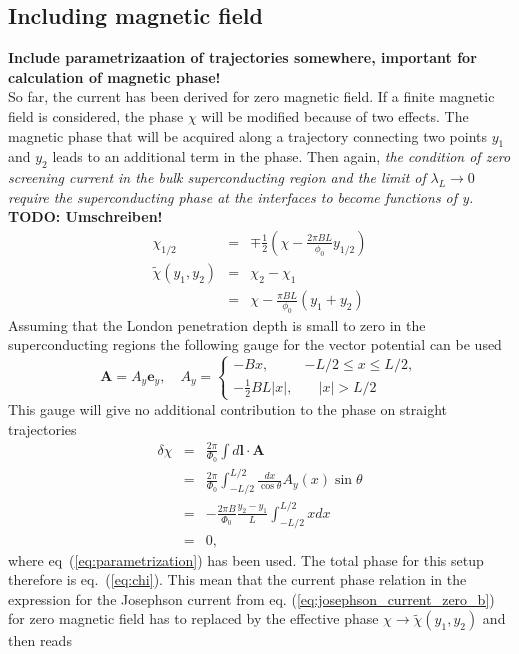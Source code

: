 \subsection*{Including magnetic field}
\textbf{Include parametrizaation of trajectories somewhere, important for calculation of magnetic phase!}\\
So far, the current has been derived for zero magnetic field. If a finite magnetic field is considered, the phase $\chi$ will be modified because of two effects. The magnetic phase that will be acquired along a trajectory connecting two points $y_1$ and $y_2$  leads to an additional term in the phase. Then again, \textit{the condition of zero screening current in the bulk superconducting region and the limit of} $\lambda_L \rightarrow 0$ \textit{require the superconducting phase at the interfaces to become functions of y.}\\
\textbf{TODO: Umschreiben!}\\
\begin{eqnarray}
\chi_{1/2} &=& \mp \frac{1}{2}\left( \chi - \frac{2 \pi B L }{\phi_0} y_{1/2}\right) \\
\tilde{\chi}(y_1, y_2) &=& \chi_2 - \chi_1 \\
 &=& \chi - \frac{\pi B L}{\phi_0}(y_1 + y_2)
 \label{eq:chi}
\end{eqnarray}
Assuming that the London penetration depth is small to zero in the superconducting regions the following gauge for the vector potential can be used
\begin{equation}
\mathbf{A}=A_y \mathbf{e}_y, \quad
A_y=\left\{ 
		\begin{array}{ll}
				-B x, & -L/2 \leq x \leq L/2, \\[0.2cm] 
				-\frac{1}{2} B L |x| , & \quad |x|>L/2
		\end{array} 
	\right.
\label{eq:Ay}
\end{equation}
This gauge will give no additional contribution to the phase on straight trajectories
\begin{eqnarray}
\delta \chi &=& \frac{2 \pi}{\Phi_0} \int d \mathbf{l} \cdot \mathbf{A} \\
&=& \frac{2 \pi}{\Phi_0} \int_{-L/2}^{L/2} \frac{dx}{\cos \theta} A_y (x) \sin \theta \\
&=& - \frac{2 \pi B}{\Phi_0} \frac{y_2 - y_1}{L} \int_{-L/2}^{L/2} x dx \\
&=& 0, 
\end{eqnarray}
where eq~(\ref{eq:parametrization}) has been used. The total phase for this setup therefore is eq.~(\ref{eq:chi}). This mean that the current phase relation in the expression for the Josephson current from eq. (\ref{eq:josephson_current_zero_b}) for zero magnetic field has to replaced by the effective phase $\chi \rightarrow \tilde{\chi}(y_1, y_2)$ and then reads
